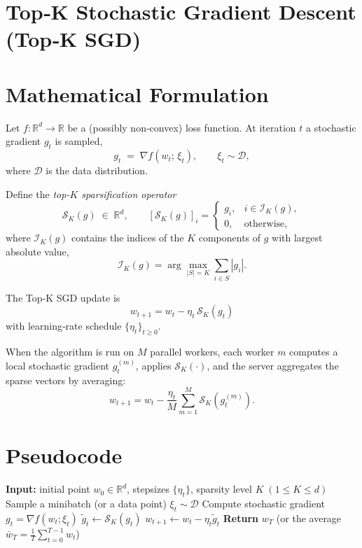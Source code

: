 \documentclass{article}
\newcommand{\topk}[1]{\mathcal{S}_K(#1)}
\begin{document}
\section*{Top‑K Stochastic Gradient Descent (Top‑K SGD)}

\section*{Mathematical Formulation}
Let $f:\mathbb{R}^d\rightarrow\mathbb{R}$ be a (possibly non‑convex) loss function.  
At iteration $t$ a stochastic gradient $g_t$ is sampled,
\[
g_t \;=\; \nabla f(w_t;\,\xi_t),\qquad \xi_t\sim\mathcal{D},
\]
where $\mathcal{D}$ is the data distribution.  

Define the \emph{top‑$K$ sparsification operator}
\[
\topk{g}\;\in\;\mathbb{R}^d,\qquad
[\topk{g}]_i=\begin{cases}
g_i, & i\in\mathcal{I}_K(g),\\[2mm]
0,   & \text{otherwise},
\end{cases}
\]
where $\mathcal{I}_K(g)$ contains the indices of the $K$ components of $g$ with largest absolute value,
\[
\mathcal{I}_K(g)=\arg\!\max_{|S|=K}\sum_{i\in S}|g_i|.
\]

The Top‑K SGD update is
\begin{equation}
\boxed{\,w_{t+1}=w_t-\eta_t\,\topk{g_t}\,} \tag{1}
\end{equation}
with learning‑rate schedule $\{\eta_t\}_{t\ge0}$.

When the algorithm is run on $M$ parallel workers, each worker $m$ computes a local stochastic gradient $g_t^{(m)}$, applies $\topk{\cdot}$, and the server aggregates the sparse vectors by averaging:
\[
w_{t+1}=w_t-\frac{\eta_t}{M}\sum_{m=1}^{M}\topk{g_t^{(m)}} .
\]

\section*{Pseudocode}
\begin{algorithm}[H]
\caption{Top‑K SGD}
\begin{algorithmic}[1]
\State \textbf{Input:} initial point $w_0\in\mathbb{R}^d$, stepsizes $\{\eta_t\}$, sparsity level $K\;(1\le K\le d)$
    \State Sample a minibatch (or a data point) $\xi_t\sim\mathcal D$
    \State Compute stochastic gradient $g_t=\nabla f(w_t;\xi_t)$
    \State $\displaystyle \tilde g_t\gets \topk{g_t}$ 
    \State $w_{t+1}\gets w_t-\eta_t\tilde g_t$
\EndFor
\State \textbf{Return} $w_T$ (or the average $\bar w_T=\frac1T\sum_{t=0}^{T-1}w_t$)
\end{algorithmic}
\end{algorithm}
\end{document}
